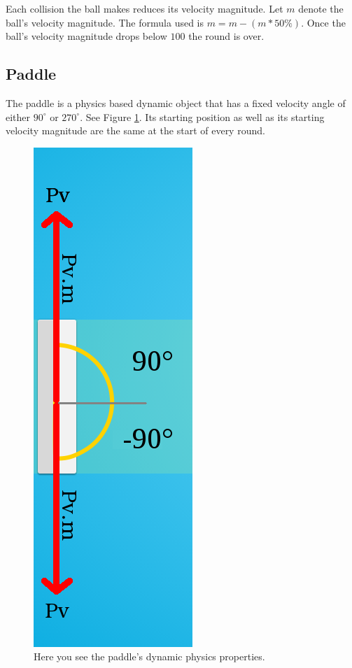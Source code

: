 \documentclass[a4paper,10pt]{article}
\begin{document}
Each collision the ball makes reduces its velocity magnitude. Let $m$ denote the ball's velocity magnitude. The formula used is $m = m - (m * 50\%)$. Once the ball's velocity magnitude drops below $100$ the round is over.

\pagebreak

\subsection{Paddle}

The paddle is a physics based dynamic object that has a fixed velocity angle of either $90^\circ$ or $270^\circ$. See Figure \ref{fig:paddle}. Its starting position as well as its starting velocity magnitude are the same at the start of every round. 

\begin{figure}[H]  
  \centering
  \includegraphics[width=.3\textwidth]{figures/paddle.png}
  \caption{Here you see the paddle's dynamic physics properties.}
  \label{fig:paddle}
\end{figure}
\end{document}
